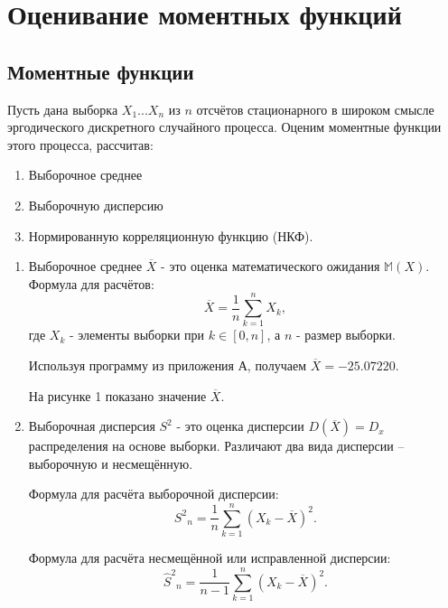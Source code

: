 \documentclass[12pt, fleqn]{article}
\begin{document}
\section{Оценивание моментных функций}
{
						    
	\subsection{Моментные функции}
	Пусть дана выборка $X_{1} ... X_{n}$ из $n$ отсчётов стационарного в широком смысле эргодического дискретного случайного процесса. Оценим моментные функции этого процесса, рассчитав:
	\begin{enumerate}
		\item Выборочное среднее
		\item Выборочную дисперсию
		\item Нормированную корреляционную функцию (НКФ).
	\end{enumerate}
						      
	\begin{enumerate}
		\item {
			Выборочное среднее $\overline{X}$ - это оценка математического ожидания $\mathbb{M}(X)$. Формула для расчётов:
			\begin{equation}
				\overline{X}=\frac{1}{n}\sum_{k=1}^{n} X_k,
			\end{equation}
			где $X_k$ - элементы выборки при $k \in [0, n]$, а $n$ - размер выборки.        
																		        
			Используя программу из приложения А, получаем $\overline{X} = -25.07220$.
																		        
			На рисунке 1 показано значение $ \overline{X} $.
		}
		\item
		      {
		      	Выборочная дисперсия $S^2$ - это оценка дисперсии $D(\overline{X})=D_x$ распределения на основе выборки.
		      	Различают два вида дисперсии -- выборочную и несмещённую.
		      			      			      			      			      			      	        
		      	Формула для расчёта выборочной дисперсии:
		      	\begin{equation}
		      		{S^2}_n=\frac{1}{n}\sum_{k=1}^{n}{(X_k - \overline{X})^2}.
		      	\end{equation}
		      			      			      			      			      			      	        
		      	Формула для расчёта несмещённой или исправленной дисперсии:
		      	\begin{equation}\label{disp}
		      		{\hat{S}^2}_n=\frac{1}{n-1}\sum_{k=1}^{n}{(X_k - \overline{X})^2}.
		      	\end{equation}
		      			      			      			      			      			      	        
}
\end{enumerate}}
\end{document}
